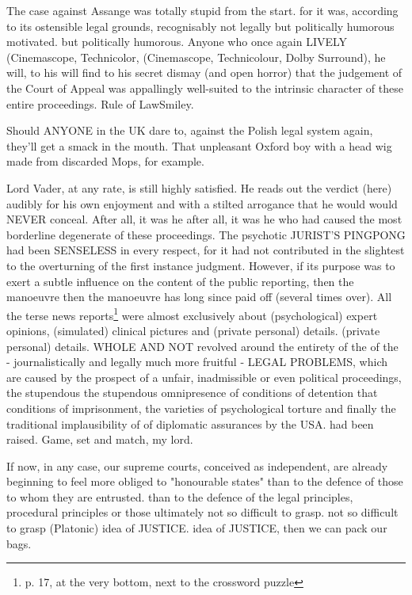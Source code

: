 \begin{multicols}{2}
The case against Assange was totally stupid from the start.
for it was, according to its ostensible legal grounds, recognisably not legally but politically humorous motivated.
but politically humorous. Anyone who
once again LIVELY (Cinemascope, Technicolor,
(Cinemascope, Technicolour, Dolby Surround), he will, to his
will find to his secret dismay (and open horror) that the judgement of the Court of Appeal was
appallingly well-suited to the intrinsic
character of these entire proceedings. Rule of LawSmiley.

Should ANYONE in the UK dare to,
against the Polish legal system again, they'll get a smack in the mouth. That unpleasant
Oxford boy with a head wig made from discarded
Mops, for example.

Lord Vader, at any rate, is still highly satisfied. He
reads out the verdict (here) audibly for his own enjoyment and with a stilted arrogance that he would
would NEVER conceal. After all, it was he
after all, it was he who had caused the most borderline degenerate
of these proceedings. The psychotic JURIST'S PINGPONG had been SENSELESS in every respect, for it had not contributed in the slightest to the overturning of the first instance judgment. However, if its
purpose was to exert a subtle influence on the content of the public reporting, then the manoeuvre
then the manoeuvre has long since paid off (several times over). All the terse news reports\footnote[34]{p. 17, at the very bottom, next to the crossword puzzle} were almost exclusively about (psychological) expert opinions, (simulated) clinical pictures and (private personal) details.
(private personal) details. WHOLE AND
NOT revolved around the entirety of the
of the - journalistically and legally much more fruitful - LEGAL PROBLEMS, which are caused by the prospect of a
unfair, inadmissible or even political proceedings, the stupendous
the stupendous omnipresence of conditions of detention that
conditions of imprisonment, the varieties of psychological torture
and finally the traditional implausibility of
of diplomatic assurances by the USA.
had been raised. Game, set and match, my lord.

If now, in any case, our supreme courts, conceived as independent, are already beginning to feel more obliged to "honourable states" than to the defence of those to whom they are entrusted.
than to the defence of the legal principles, procedural principles or those ultimately not so difficult to grasp.
not so difficult to grasp (Platonic) idea of JUSTICE.
idea of JUSTICE, then we can pack our bags.


\end{multicols}
